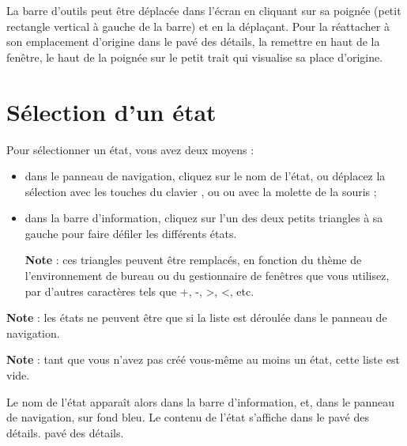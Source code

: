 La barre d'outils peut être déplacée dans l'écran en cliquant sur sa poignée (petit rectangle vertical à gauche de la barre) et en la déplaçant. Pour la réattacher à son emplacement d'origine dans le pavé des détails, la remettre en haut de la fenêtre, le haut de la poignée sur le petit  trait qui visualise sa place d'origine.


\section{Sélection d'un état\label{reports-selection}}


Pour sélectionner un état, vous avez deux moyens :

\begin{itemize}
	 \item dans le panneau de navigation, cliquez sur le nom de l'état, ou déplacez la sélection avec les touches du clavier  ,   ou  ou avec la molette de la souris ;
	 \item  dans la barre d'information, cliquez sur l'un des deux petits triangles à sa gauche pour faire défiler les différents états.

	 \textbf{Note} : ces triangles peuvent être remplacés, en fonction du thème de l'environnement de bureau ou du gestionnaire de fenêtres que vous utilisez, par d'autres caractères tels que +, -, >, <, etc.
\end{itemize}

	\textbf{Note} : les états ne peuvent être  que si la liste est déroulée dans le panneau de navigation.

\textbf{Note} : tant que vous n'avez pas créé vous-même au moins un état, cette liste est vide.

Le nom de l'état apparaît alors dans la barre d'information, et, dans le panneau de navigation, sur fond bleu{\couleur}. Le contenu de l'état s'affiche dans le \ifIllustration pavé des détails.
\else pavé des détails.
\fi

